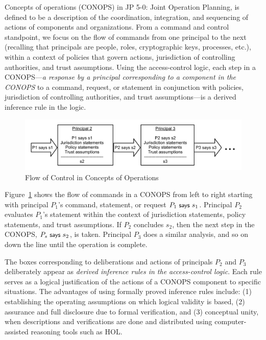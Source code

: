 
Concepts of operations (CONOPS) in JP 5-0: Joint Operation Planning,
is defined to be a description of the coordination, integration, and
sequencing of actions of components and organizations.  From a command
and control standpoint, we focus on the flow of commands from one
principal to the next (recalling that principals are people, roles,
cryptographic keys, processes, etc.), within a context of policies
that govern actions, jurisdiction of controlling authorities, and
trust assumptions.  Using the access-control logic, each step in a
CONOPS---\emph{a response by a principal corresponding to a component
  in the CONOPS} to a command, request, or statement in conjunction
with policies, jurisdiction of controlling authorities, and trust
assumptions---is a derived inference rule in the logic.

\begin{figure}[tb]
  \centering
  \includegraphics[width=0.95\linewidth]{Figures/c2conops/blockDiagram}
  \caption{Flow of Control in Concepts of Operations}
  \label{fig:conops-flow}
\end{figure}

Figure~\ref{fig:conops-flow} shows the flow of commands in a CONOPS
from left to right starting with principal $P_1$'s command, statement,
or request $P_1 \text{\small\textsf{ says }} s_1$. Principal $P_2$ evaluates $P_1$'s
statement within the context of jurisdiction statements, policy
statements, and trust assumptions.  If $P_2$ concludes $s_2$, then the
next step in the CONOPS, $P_s \text{\small\textsf{ says }} s_2$, is taken. Principal $P_3$
does a similar analysis, and so on down the line until the operation
is complete.

The boxes corresponding to deliberations and actions of principals
$P_2$ and $P_3$ deliberately appear as \emph{derived inference rules
  in the access-control logic}.  Each rule serves as a logical
justification of the actions of a CONOPS component to specific
situations. The advantages of using formally proved inference rules
include: (1) establishing the operating assumptions on which logical
validity is based, (2) assurance and full disclosure due to formal
verification, and (3) conceptual unity, when descriptions and
verifications are done and distributed using computer-assisted
reasoning tools such as HOL.


